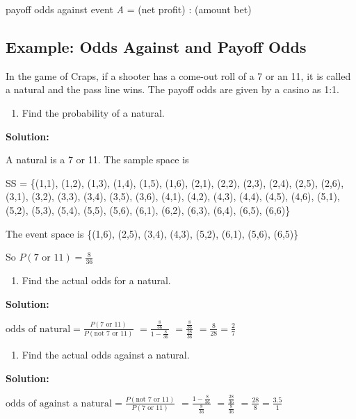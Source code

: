 \documentclass[
]{book}
\providecommand{\tightlist}{%
  \setlength{\itemsep}{0pt}\setlength{\parskip}{0pt}}
\begin{document}
payoff odds against event \emph{A} = (net profit) : (amount bet)

\hypertarget{example-odds-against-and-payoff-odds}{%
\subsection{Example: Odds Against and Payoff Odds}\label{example-odds-against-and-payoff-odds}}

In the game of Craps, if a shooter has a come-out roll of a 7 or an 11, it is called a natural and the pass line wins. The payoff odds are given by a casino as 1:1.

\begin{enumerate}
\def\labelenumi{\alph{enumi}.}
\tightlist
\item
  Find the probability of a natural.
\end{enumerate}

\textbf{Solution:}

A natural is a 7 or 11. The sample space is

SS = \{(1,1), (1,2), (1,3), (1,4), (1,5), (1,6),
(2,1), (2,2), (2,3), (2,4), (2,5), (2,6),
(3,1), (3,2), (3,3), (3,4), (3,5), (3,6),
(4,1), (4,2), (4,3), (4,4), (4,5), (4,6),
(5,1), (5,2), (5,3), (5,4), (5,5), (5,6),
(6,1), (6,2), (6,3), (6,4), (6,5), (6,6)\}

The event space is \{(1,6), (2,5), (3,4), (4,3), (5,2), (6,1), (5,6),
(6,5)\}

So \(P(\text{7 or 11})=\frac{8}{36}\)

\begin{enumerate}
\def\labelenumi{\alph{enumi}.}
\setcounter{enumi}{1}
\tightlist
\item
  Find the actual odds for a natural.
\end{enumerate}

\textbf{Solution:}

\(\text{odds of natural}=\frac{P(\text{7 or 11})}{P(\text{not 7 or 11})}\)
\(=\frac{\frac{8}{36}}{1-\frac{8}{36}}\)
\(=\frac{\frac{8}{36}}{\frac{28}{36}}\)
\(=\frac{8}{28}=\frac{2}{7}\)

\begin{enumerate}
\def\labelenumi{\alph{enumi}.}
\setcounter{enumi}{2}
\tightlist
\item
  Find the actual odds against a natural.
\end{enumerate}

\textbf{Solution:}

\(\text{odds of against a natural}=\frac{P(\text{not 7 or 11})}{P(\text{7 or 11})}\)
\(=\frac{1-\frac{8}{36}}{\frac{8}{36}}\)
\(=\frac{\frac{28}{36}}{\frac{8}{36}}\)
\(=\frac{28}{8}=\frac{3.5}{1}\)
\end{document}

